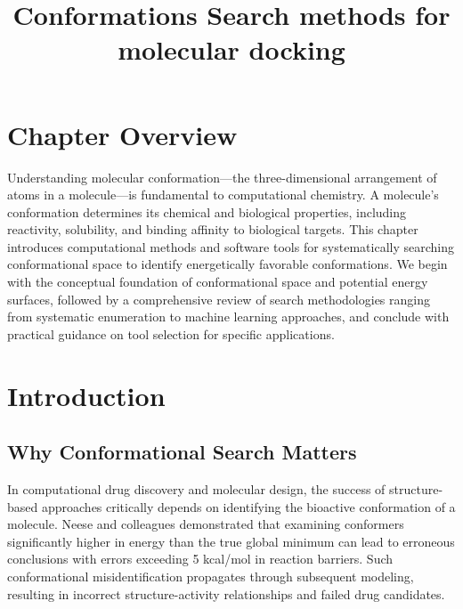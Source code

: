 \documentclass[12pt]{article}
\title{Conformations Search methods for molecular docking}
\begin{document}
\maketitle


\section*{Chapter Overview}

Understanding molecular conformation---the three-dimensional arrangement of atoms in a molecule---is fundamental to computational chemistry. A molecule's conformation determines its chemical and biological properties, including reactivity, solubility, and binding affinity to biological targets. This chapter introduces computational methods and software tools for systematically searching conformational space to identify energetically favorable conformations. We begin with the conceptual foundation of conformational space and potential energy surfaces, followed by a comprehensive review of search methodologies ranging from systematic enumeration to machine learning approaches, and conclude with practical guidance on tool selection for specific applications.

\section{Introduction}

\subsection{Why Conformational Search Matters}

In computational drug discovery and molecular design, the success of structure-based approaches critically depends on identifying the bioactive conformation of a molecule. Neese and colleagues demonstrated that examining conformers significantly higher in energy than the true global minimum can lead to erroneous conclusions with errors exceeding 5 kcal/mol in reaction barriers. Such conformational misidentification propagates through subsequent modeling, resulting in incorrect structure-activity relationships and failed drug candidates.
\end{document}
